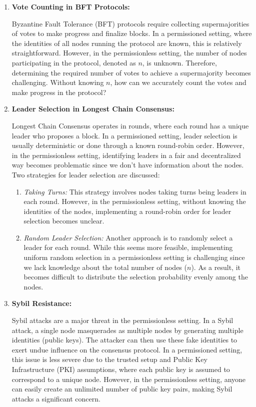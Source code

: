 \begin{enumerate}
    \item \textbf{Vote Counting in BFT Protocols:}
    
    Byzantine Fault Tolerance (BFT) protocols require collecting supermajorities of votes to make progress and finalize blocks. In a permissioned setting, where the identities of all nodes running the protocol are known, this is relatively straightforward. However, in the permissionless setting, the number of nodes participating in the protocol, denoted as $n$, is unknown. Therefore, determining the required number of votes to achieve a supermajority becomes challenging. Without knowing $n$, how can we accurately count the votes and make progress in the protocol?
    
    \item \textbf{Leader Selection in Longest Chain Consensus:}
    
    Longest Chain Consensus operates in rounds, where each round has a unique leader who proposes a block. In a permissioned setting, leader selection is usually deterministic or done through a known round-robin order. However, in the permissionless setting, identifying leaders in a fair and decentralized way becomes problematic since we don't have information about the nodes. Two strategies for leader selection are discussed:
    
    \begin{enumerate}
        \item \textit{Taking Turns:} This strategy involves nodes taking turns being leaders in each round. However, in the permissionless setting, without knowing the identities of the nodes, implementing a round-robin order for leader selection becomes unclear.
        
        \item \textit{Random Leader Selection:} Another approach is to randomly select a leader for each round. While this seems more feasible, implementing uniform random selection in a permissionless setting is challenging since we lack knowledge about the total number of nodes ($n$). As a result, it becomes difficult to distribute the selection probability evenly among the nodes.
    \end{enumerate}
    
    \item \textbf{Sybil Resistance:}
    
    Sybil attacks are a major threat in the permissionless setting. In a Sybil attack, a single node masquerades as multiple nodes by generating multiple identities (public keys). The attacker can then use these fake identities to exert undue influence on the consensus protocol. In a permissioned setting, this issue is less severe due to the trusted setup and Public Key Infrastructure (PKI) assumptions, where each public key is assumed to correspond to a unique node. However, in the permissionless setting, anyone can easily create an unlimited number of public key pairs, making Sybil attacks a significant concern.
\end{enumerate}

